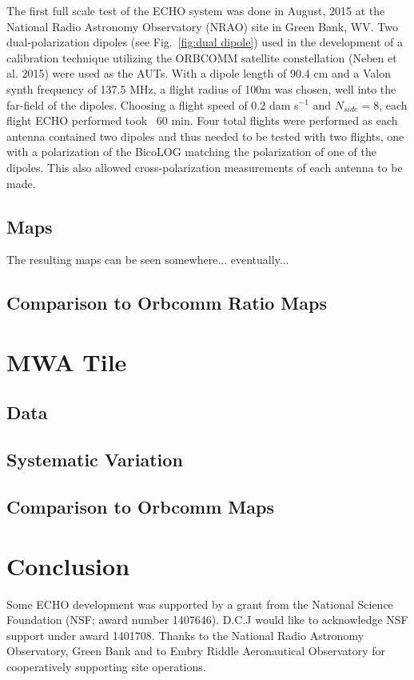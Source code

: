 \documentclass[preprint2,numberedappendix,tighten,twocolappendix]{aastex6}
\begin{document}
The first full scale test of the ECHO system was done in August, 2015 at the National Radio Astronomy Observatory (NRAO) site in Green Bank, WV.  Two dual-polarization dipoles (see Fig.~\ref{fig:dual dipole}) used in the development of a calibration technique utilizing the ORBCOMM satellite constellation (Neben et al. 2015) were used as the AUTs.  With a dipole length of 90.4 cm and a Valon synth frequency of 137.5 MHz, a flight radius of 100m was chosen, well into the far-field of the dipoles.  Choosing a flight speed of 0.2 dam s$^{-1}$ and $N_{side}=8$, each flight ECHO performed took ~60 min.  Four total flights were performed as each antenna contained two dipoles and thus needed to be tested with two flights, one with a polarization of the BicoLOG matching the polarization of one of the dipoles.  This also allowed cross-polarization measurements of each antenna to be made.


\subsection{Maps}

The resulting maps can be seen somewhere... eventually...

\subsection{Comparison to Orbcomm Ratio Maps}




\section{MWA Tile}

\subsection{Data}

\subsection{Systematic Variation}

\subsection{Comparison to Orbcomm Maps}





\section{Conclusion}


\acknowledgments
Some ECHO development was supported by a grant from the National Science Foundation (NSF; award number 1407646). D.C.J would like to acknowledge NSF support  under award 1401708.
Thanks to the National Radio Astronomy Observatory, Green Bank and to Embry Riddle Aeronautical Observatory for cooperatively supporting site operations.
\end{document}
